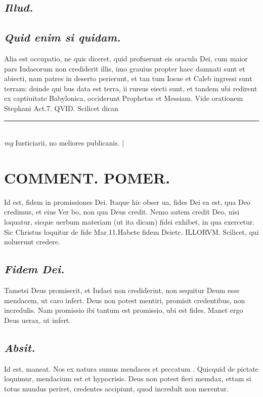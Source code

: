 \documentclass{article}
\begin{document}
\begin{pages}
\subsection*{\textit{Illud. }}
{}
\subsection*{\textit{Quid enim si quidam. }}\pstart Alia est occupatio, ne quis diceret, quid profuerunt eis oracula Dei, cum maior pars Iudaeorum non crediderit illis, imo grauius propter haec damnati sunt et abiecti, nam patres in deserto perierunt, et tan tum Iosue et Caleb ingressi sunt terram: deinde qui bus data est terra, ii rursus eiecti sunt, et tandem ubi redirent ex captiuitate Babylonica, occiderunt Prophetas et Messiam. Vide orationem Stephani Act.7.  QVID. Scilicet dican\pend
\vspace{0.5cm}\noindent
\vspace{0.2cm}\rule{1cm}{0.2pt}\\ 
\hspace{0.2cm}\textit{mg}
\footnotesize Iusticiarii, no meliores publicanis. 
\normalsize| 
\section*{COMMENT. POMER.  }\pstart Id est, fidem in promissiones Dei. Itaque hic obser ua, fides Dei ea est, qua Deo credimus, et eius Ver bo, non qua Deus credit. Nemo autem credit Deo, nisi loquatur, sicque uerbum materiam (ut ita dicam) fidei exhibet, in qua exercetur. Sic Christus loquitur de fide Mar.11.Habete fidem Deietc. ILLORVM. Scilicet, qui noluerunt credere.  \pend
{}
{}
\subsection*{\textit{Fidem Dei. }}\pstart Tametsi Deus promiserit, et Iudaei non crediderint, non sequitur Deum esse mendacem, ut caro infert. Deus non potest mentiri, promisit credentibus, non incredulis. Nam promissio ibi tantum est promissio, ubi est fides. Manet ergo Deus uerax, ut infert.   \pend
{}
{}
\subsection*{\textit{Absit. }}\pstart Id est, maneat. Nos ex natura sumus mendaces et peccatum . Quicquid de pictate loquimur, mendacium est et hypocrisis. Deus non potest fieri memdax, ettam si totus mundus periret, credentes accipiunt, quod incredult non merentur.   \pend
{}
{}

\end{pages}
\end{document}
